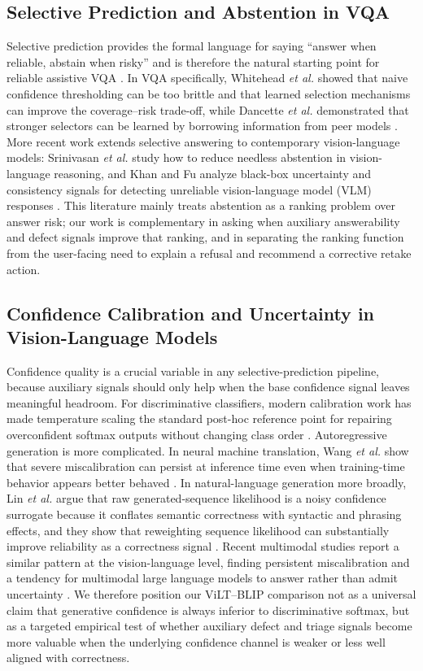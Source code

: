 \documentclass{ieeeaccess}
\newcommand{\vilt}{ViLT}
\newcommand{\blip}{BLIP}
\begin{document}
\subsection{Selective Prediction and Abstention in VQA}
Selective prediction provides the formal language for saying ``answer when reliable, abstain when risky'' and is therefore the natural starting point for reliable assistive VQA \cite{elyaniv2010foundations}. In VQA specifically, Whitehead \emph{et al.} showed that naive confidence thresholding can be too brittle and that learned selection mechanisms can improve the coverage--risk trade-off, while Dancette \emph{et al.} demonstrated that stronger selectors can be learned by borrowing information from peer models \cite{whitehead2022reliable,dancette2023improving}. More recent work extends selective answering to contemporary vision-language models: Srinivasan \emph{et al.} study how to reduce needless abstention in vision-language reasoning, and Khan and Fu analyze black-box uncertainty and consistency signals for detecting unreliable vision-language model (VLM) responses \cite{srinivasan2024selective,khan2024consistency}. This literature mainly treats abstention as a ranking problem over answer risk; our work is complementary in asking when auxiliary answerability and defect signals improve that ranking, and in separating the ranking function from the user-facing need to explain a refusal and recommend a corrective retake action.

\subsection{Confidence Calibration and Uncertainty in Vision-Language Models}
Confidence quality is a crucial variable in any selective-prediction pipeline, because auxiliary signals should only help when the base confidence signal leaves meaningful headroom. For discriminative classifiers, modern calibration work has made temperature scaling the standard post-hoc reference point for repairing overconfident softmax outputs without changing class order \cite{guo2017calibration}. Autoregressive generation is more complicated. In neural machine translation, Wang \emph{et al.} show that severe miscalibration can persist at inference time even when training-time behavior appears better behaved \cite{wang2020inferencecalibration}. In natural-language generation more broadly, Lin \emph{et al.} argue that raw generated-sequence likelihood is a noisy confidence surrogate because it conflates semantic correctness with syntactic and phrasing effects, and they show that reweighting sequence likelihood can substantially improve reliability as a correctness signal \cite{lin2024csl}. Recent multimodal studies report a similar pattern at the vision-language level, finding persistent miscalibration and a tendency for multimodal large language models to answer rather than admit uncertainty \cite{chen2024unveiling}. We therefore position our \vilt{}--\blip{} comparison not as a universal claim that generative confidence is always inferior to discriminative softmax, but as a targeted empirical test of whether auxiliary defect and triage signals become more valuable when the underlying confidence channel is weaker or less well aligned with correctness.
\end{document}
